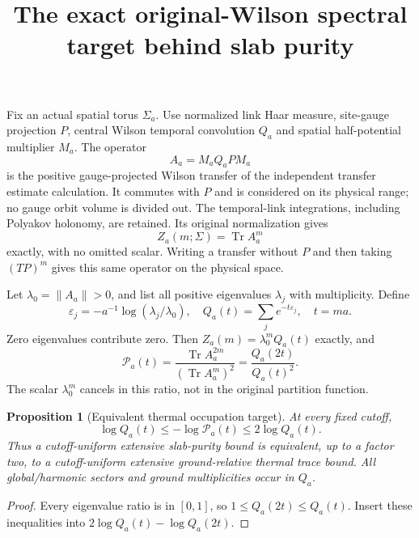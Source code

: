 \documentclass{article}
\title{The exact original-Wilson spectral target behind slab purity}\author{}\date{}
\newtheorem{proposition}{Proposition}
\begin{document}
\maketitle
Fix an actual spatial torus $\Sigma_a$. Use normalized link Haar measure, site-gauge projection $P$, central Wilson temporal convolution $Q_a$ and spatial half-potential multiplier $M_a$. The operator
\[
 A_a=M_a Q_a P M_a
\]
is the positive gauge-projected Wilson transfer of the independent transfer estimate calculation. It commutes with $P$ and is considered on its physical range; no gauge orbit volume is divided out. The temporal-link integrations, including Polyakov holonomy, are retained. Its original normalization gives
\[
 Z_a(m;\Sigma)=\operatorname{Tr}A_a^m
\]
exactly, with no omitted scalar. Writing a transfer without $P$ and then taking $(TP)^m$ gives this same operator on the physical space.

Let $\lambda_0=\|A_a\|>0$, and list all positive eigenvalues $\lambda_j$ with multiplicity. Define
\[
 \varepsilon_j=-a^{-1}\log(\lambda_j/\lambda_0),\quad
 Q_a(t)=\sum_j e^{-t\varepsilon_j},\quad t=ma.
\]
Zero eigenvalues contribute zero. Then $Z_a(m)=\lambda_0^m Q_a(t)$ exactly, and
\[
 \mathcal P_a(t)=\frac{\operatorname{Tr}A_a^{2m}}{(\operatorname{Tr}A_a^m)^2}
 =\frac{Q_a(2t)}{Q_a(t)^2}.
\]
The scalar $\lambda_0^m$ cancels in this ratio, not in the original partition function.

\begin{proposition}[Equivalent thermal occupation target]
At every fixed cutoff,
\[
 \log Q_a(t)\le-\log\mathcal P_a(t)\le2\log Q_a(t).
\]
Thus a cutoff-uniform extensive slab-purity bound is equivalent, up to a factor two, to a cutoff-uniform extensive ground-relative thermal trace bound. All global/harmonic sectors and ground multiplicities occur in $Q_a$.
\end{proposition}
\begin{proof}
Every eigenvalue ratio is in $[0,1]$, so $1\le Q_a(2t)\le Q_a(t)$. Insert these inequalities into $2\log Q_a(t)-\log Q_a(2t)$.
\end{proof}
\end{document}
